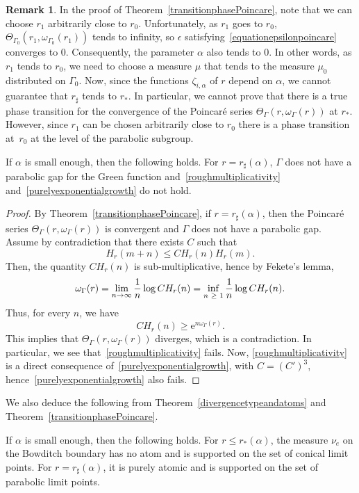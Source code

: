 \documentclass[10pt]{amsart}
\theoremstyle{definition}\newtheorem{defi}[theo]{Definition}\newtheorem{rema}[theo]{Remark}\newtheorem{exam}[theo]{Example}\newtheorem{exem}[theo]{Example}\newtheorem{nota}[theo]{Notation}
\newcommand{\rme}{\mathrm{e}}
\let\oldge\ge
\renewcommand{\ge}{\mathchoice{\oldge}{\oldge}{\,\oldge\,}{\,\oldge\,}}
\renewcommand*{\to}{\mathchoice{\longrightarrow}{\rightarrow}{\rightarrow}{\rightarrow}}
\begin{document}
\begin{rema}\label{remarkchoiceofr1}
In the proof of Theorem~\ref{transitionphasePoincare}, note that we can choose $r_1$ arbitrarily close to $r_0$. Unfortunately, as $r_1$ goes to $r_0$, $\Theta_{\Gamma_0}(r_1,\omega_{\Gamma_0}(r_1))$ tends to infinity, so $\epsilon$ satisfying~\eqref{equationepsilonpoincare} converges to 0. Consequently, the parameter $\alpha$ also tends to 0. In other words, as $r_1$ tends to $r_0$, we need to choose a measure $\mu$ that tends to the measure $\mu_0$ distributed on $\Gamma_0$. Now, since the functions $\zeta_{i,\alpha}$ of $r$ depend on $\alpha$, we cannot guarantee that $r_{\sharp}$ tends to $r_*$. In particular, we cannot prove that there is a true phase transition for the convergence of the Poincaré series $\Theta_\Gamma(r,\omega_\Gamma(r))$ at $r_*$. However, since $r_1$ can be chosen arbitrarily close to $r_0$ there is a phase transition at~$r_0$ at the level of the parabolic subgroup.
\end{rema}

\begin{coro}\label{corosubmultiplicativityfails}
If $\alpha$ is small enough, then the following holds. For $r=r_\sharp(\alpha)$, $\Gamma$ does not have a parabolic gap for the Green function and~\eqref{roughmultiplicativity} and~\eqref{purelyexponentialgrowth} do not hold.
\end{coro}


\begin{proof}
By Theorem~\ref{transitionphasePoincare}, if $r=r_\sharp(\alpha)$, then the Poincaré series $\Theta_\Gamma(r,\omega_\Gamma(r))$ is convergent and $\Gamma$ does not have a parabolic gap. Assume by contradiction that there exists $C$ such that
\[
H_r(m+n)\leq C H_r(n)H_r(m).
\]
Then, the quantity $CH_r(n)$ is sub-multiplicative, hence by Fekete's lemma,
\[
\omega_\Gamma(r)=\lim_{n\to\infty} \frac{1}{n}\log CH_r(n)=\inf_{n\ge 1} \frac{1}{n}\log CH_r(n).
\]
Thus, for every $n$, we have
\[
CH_r(n)\geq \rme^{n\omega_\Gamma(r)}.
\]
This implies that $\Theta_\Gamma(r,\omega_\Gamma(r))$ diverges, which is a contradiction. In particular, we see that~\eqref{roughmultiplicativity} fails. Now, \eqref{roughmultiplicativity} is a direct consequence of~\eqref{purelyexponentialgrowth}, with $C=(C')^3$, hence~\eqref{purelyexponentialgrowth} also fails.
\end{proof}

We also deduce the following from Theorem~\ref{divergencetypeandatoms} and Theorem~\ref{transitionphasePoincare}.
\begin{coro}\label{transitionphasePattersonSullivan}
If $\alpha$ is small enough, then the following holds. For $r\leq r_*(\alpha)$, the measure $\nu_e$ on the Bowditch boundary has no atom and is supported on the set of conical limit points. For $r=r_\sharp(\alpha)$, it is purely atomic and is supported on the set of parabolic limit points.
\end{coro}
\end{document}
